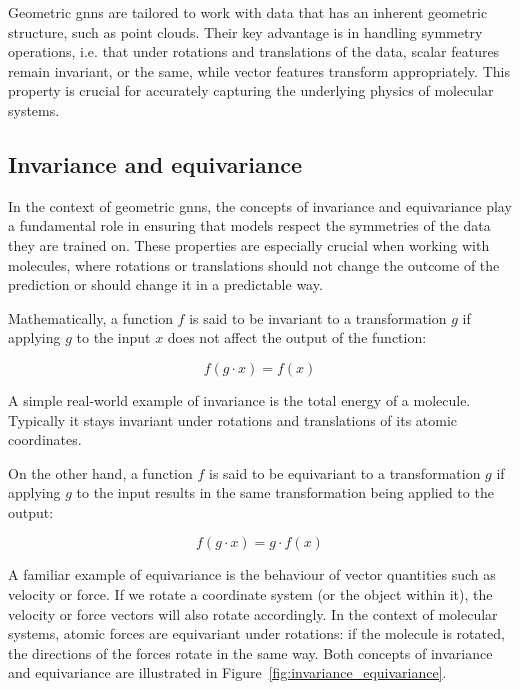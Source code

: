 Geometric \acp{gnn} are tailored to work with data that has an inherent geometric structure, such as point clouds. Their key advantage is in handling symmetry operations, i.e. that under rotations and translations of the data, scalar features remain invariant, or the same, while vector features transform appropriately. This property is crucial for accurately capturing the underlying physics of molecular systems.



\subsection{Invariance and equivariance}

In the context of geometric \acp{gnn}, the concepts of invariance and equivariance play a fundamental role in ensuring that models respect the symmetries of the data they are trained on. These properties are especially crucial when working with molecules, where rotations or translations should not change the outcome of the prediction or should change it in a predictable way.

Mathematically, a function $f$ is said to be invariant to a transformation $g$ if applying $g$ to the input $x$ does not affect the output of the function:

\begin{equation}
f(g \cdot x) = f(x)
\label{eq:invariance}
\end{equation}

A simple real-world example of invariance is the total energy of a molecule. Typically it stays invariant under rotations and translations of its atomic coordinates.

On the other hand, a function $f$ is said to be equivariant to a transformation $g$ if applying $g$ to the input results in the same transformation being applied to the output:

\begin{equation}
f(g \cdot x) = g \cdot f(x)
\label{eq:equivariance}
\end{equation}

A familiar example of equivariance is the behaviour of vector quantities such as velocity or force. If we rotate a coordinate system (or the object within it), the velocity or force vectors will also rotate accordingly. In the context of molecular systems, atomic forces are equivariant under rotations: if the molecule is rotated, the directions of the forces rotate in the same way. Both concepts of invariance and equivariance are illustrated in Figure~\ref{fig:invariance_equivariance}.


